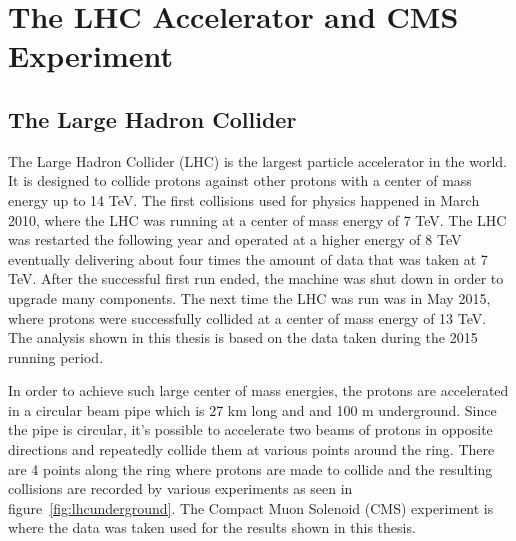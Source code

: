 \chapter{The LHC Accelerator and CMS Experiment}
\label {ch:cms}

\section{The Large Hadron Collider}
The Large Hadron Collider (LHC) is the largest particle accelerator in the world.
It is designed to collide protons against other protons with a center of mass energy up to 14 TeV.
The first collisions used for physics happened in March 2010, where the LHC was running at a center of mass energy of 7 TeV.
The LHC was restarted the following year and operated at a higher energy of 8 TeV
eventually delivering about four times the amount of data that was taken at 7 TeV.
After the successful first run ended, the machine was shut down in order to upgrade many components.
The next time the LHC was run was in May 2015, where protons were successfully collided at a center of mass energy of 13 TeV.
The analysis shown in this thesis is based on the data taken during the 2015 running period.

In order to achieve such large center of mass energies,
the protons are accelerated in a circular beam pipe which is 27 km long and and 100 m underground.
Since the pipe is circular,
it's possible to accelerate two beams of protons in opposite directions and repeatedly collide them at various points around the ring.
There are 4 points along the ring where protons are made to collide and the resulting collisions are recorded by various experiments as seen in figure~\ref{fig:lhcunderground}.
The Compact Muon Solenoid (CMS) experiment is where the data was taken used for the results shown in this thesis.

